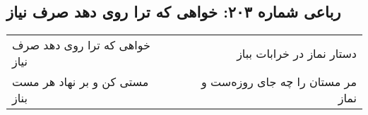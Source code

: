 \begin{center}
\section*{رباعی شماره ۲۰۳: خواهی که ترا روی دهد صرف نیاز}
\label{sec:sh203}
\begin{longtable}{l p{0.5cm} r}
خواهی که ترا روی دهد صرف نیاز
&&
دستار نماز در خرابات بباز
\\
مستی کن و بر نهاد هر مست بناز
&&
مر مستان را چه جای روزه‌ست و نماز
\\
\end{longtable}
\end{center}
